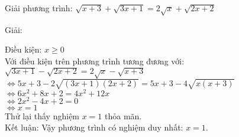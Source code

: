 \begin{vd}
  Giải phương trình: $  \sqrt{x+3} + \sqrt{3x+1} = 2\sqrt{x} + \sqrt{2x+2}  $
\end{vd}
\begin{center}
    Giải:
\end{center}

Điều kiện: $ x \geq 0 $ \\
Với điều kiện trên phương trình tương đương với: \\
$ \sqrt{3x+1} - \sqrt{2x+2} = 2\sqrt{x} - \sqrt{x+3} $ \\
$ \Leftrightarrow 
    5x + 3 -2\sqrt{(3x+1)(2x+2)} = 5x + 3 -4\sqrt{x(x+3)}
$ \\
$ \Leftrightarrow 
    6x^2 + 8x +2 = 4x^2 + 12x 
$ \\
$ \Leftrightarrow 
    2x^2 - 4x + 2=0 
$ \\
$ \Leftrightarrow 
    x= 1 $ \\
    Thử lại thấy nghiệm $ x= 1 $ thỏa mãn. \\
    Kết luận: Vậy phương trình có nghiệm duy nhất: $ x=1 $.
